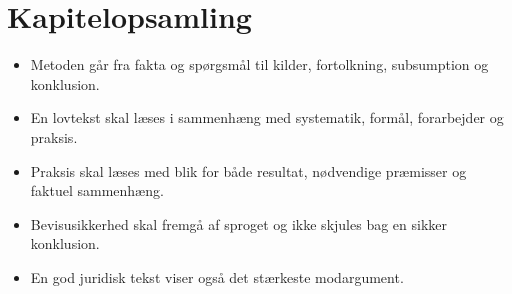 
\section*{Kapitelopsamling}
\begin{itemize}
  \item Metoden går fra fakta og spørgsmål til kilder, fortolkning, subsumption og konklusion.
  \item En lovtekst skal læses i sammenhæng med systematik, formål, forarbejder og praksis.
  \item Praksis skal læses med blik for både resultat, nødvendige præmisser og faktuel sammenhæng.
  \item Bevisusikkerhed skal fremgå af sproget og ikke skjules bag en sikker konklusion.
  \item En god juridisk tekst viser også det stærkeste modargument.
\end{itemize}

